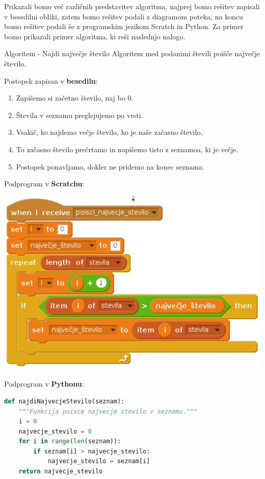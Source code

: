 Prikazali bomo več različnih predstavitev algoritma, najprej bomo
rešitev zapisali v besedilni obliki, zatem bomo rešitev podali z
diagramom poteka, na koncu bomo rešitev podali še z programskim
jezikom Scratch in Python.  Za primer bomo prikazali primer algoritma,
ki reši naslednjo nalogo.



\begin{examplebox}[label={prog:al01}]{Algoritem - Najdi največje število}
Algoritem med podanimi števili poišče največje število.

Postopek zapisan v \textbf{besedilu}:
\begin{enumerate}
\tightlist
\item Zapišemo si začetno število, naj bo $0$.
\item Števila v seznamu preglejujemo po vrsti.
\item Vsakič, ko najdemo večje število, ko je naše začasno število,
\item To začasno število prečrtamo in napišemo tisto z seznamoa, ki je
  večje.
\item Postopek ponavljamo, dokler ne pridemo na konec seznama.
\end{enumerate}


Podprogram v \textbf{Scratchu}:

    \includegraphics [width=0.6\linewidth, keepaspectratio =
    1] {./images/scratchImg/01-Scr_Alg-NajvecjeSt-img_trs.png}

Podprogram v \textbf{Pythonu}:

\begin{lstlisting}[language=Python]
def najdiNajvecjeStevilo(seznam):
    """Funkcija poisce najvecje stevilo v seznamu."""
    i = 0
    najvecje_stevilo = 0
    for i in range(len(seznam)):
        if seznam[i] > najvecje_stevilo:
            najvecje_stevilo = seznam[i]
    return najvecje_stevilo
\end{lstlisting}
\end{examplebox}

